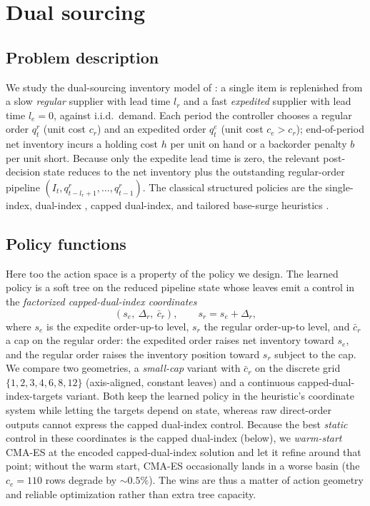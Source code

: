 \documentclass[11pt]{article}
\begin{document}
\section{Dual sourcing}
\label{sec:dual-sourcing}

\subsection{Problem description}

We study the dual-sourcing inventory model of \citet{gijsbrechts2022drl}: a single item is
replenished from a slow \emph{regular} supplier with lead time $l_r$ and a fast \emph{expedited}
supplier with lead time $l_e=0$, against i.i.d.\ demand. Each period the controller chooses a
regular order $q^r_t$ (unit cost $c_r$) and an expedited order $q^e_t$ (unit cost $c_e>c_r$);
end-of-period net inventory incurs a holding cost $h$ per unit on hand or a backorder penalty $b$
per unit short. Because only the expedite lead time is zero, the relevant post-decision state
reduces to the net inventory plus the outstanding regular-order pipeline
$(I_t, q^r_{t-l_r+1},\dots,q^r_{t-1})$. The classical structured policies are the single-index,
dual-index \citep{veeraraghavan2008dualindex}, capped dual-index, and tailored base-surge
heuristics \citep{sheopuri2010dualsourcing}.

\subsection{Policy functions}

Here too the action space is a property of the policy we design. The learned policy is a soft tree
on the reduced pipeline state whose leaves emit a control in the \emph{factorized
capped-dual-index coordinates}
\[
(s_e,\ \Delta_r,\ \bar c_r),\qquad s_r=s_e+\Delta_r,
\]
where $s_e$ is the expedite order-up-to level, $s_r$ the regular order-up-to level, and $\bar c_r$ a
cap on the regular order: the expedited order raises net inventory toward $s_e$, and the regular
order raises the inventory position toward $s_r$ subject to the cap. We compare two geometries, a
\emph{small-cap} variant with $\bar c_r$ on the discrete grid $\{1,2,3,4,6,8,12\}$ (axis-aligned,
constant leaves) and a continuous capped-dual-index-targets variant. Both keep the learned policy
in the heuristic's coordinate system while letting the targets depend on state, whereas raw
direct-order outputs cannot express the capped dual-index control. Because the best \emph{static}
control in these coordinates is the capped dual-index (below), we \emph{warm-start} CMA-ES at the
encoded capped-dual-index solution and let it refine around that point; without the warm start,
CMA-ES occasionally lands in a worse basin (the $c_e=110$ rows degrade by $\sim0.5\%$). The wins are
thus a matter of action geometry and reliable optimization rather than extra tree capacity.
\end{document}
